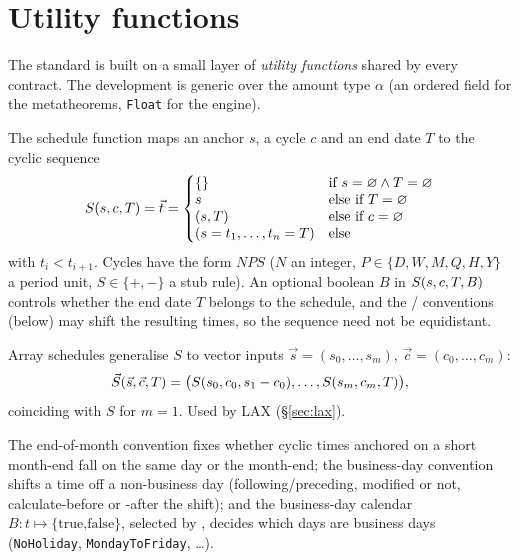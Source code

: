 \section{Utility functions}\label{sec:utils}

The standard is built on a small layer of \emph{utility functions} shared by
every contract.  The development is generic over the amount type
$\alpha$ (an ordered field for the metatheorems, \texttt{Float} for the engine).

\begin{definition}\label{def:schedule}
        \leanok
        The schedule function maps an anchor $s$, a cycle $c$ and an end date
        $T$ to the cyclic sequence
        \[
          \sdl{s}{c}{T}=\vec{t}=\left\{\begin{array}{@{}l@{\quad}l@{}}
            \{\} & \text{if } s=\nul\land T=\nul\\
            s & \text{else if } T=\nul\\
            (s,T) & \text{else if } c=\nul\\
            (s=t_1,\dots,t_n=T) & \text{else}
          \end{array}\right.
        \]
        with $t_i<t_{i+1}$.  Cycles have the form $NPS$ ($N$ an integer, $P\in
        \{D,W,M,Q,H,Y\}$ a period unit, $S\in\{+,-\}$ a stub rule).  An optional
        boolean $B$ in $S(s,c,T,B)$ controls whether the end date $T$
        belongs to the schedule, and the / conventions
        (below) may shift the resulting times, so the sequence need not be
        equidistant.
\end{definition}

\begin{definition}\label{def:arrayschedule}
        \leanok
        Array schedules generalise $S$ to vector inputs
        $\vec{s}=(s_0,\dots,s_m)$, $\vec{c}=(c_0,\dots,c_m)$:
        \[
          \vec{S}(\vec{s},\vec{c},T) =
            \big(S(s_0,c_0,s_1-c_0),\dots,S(s_m,c_m,T)\big),
        \]
        coinciding with $S$ for $m=1$.  Used by LAX (\S\ref{sec:lax}).
\end{definition}

\begin{definition}\label{def:conventions}
        \leanok
        The end-of-month convention  fixes whether cyclic times
        anchored on a short month-end fall on the same day or the month-end; the
        business-day convention  shifts a time off a non-business day
        (following/preceding, modified or not, calculate-before or -after the
        shift); and the business-day calendar $B:t\mapsto\{\text{true,false}\}$,
        selected by , decides which days are business days
        (\texttt{NoHoliday}, \texttt{MondayToFriday}, \dots).
\end{definition}

